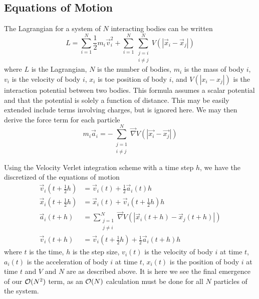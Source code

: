 %
%
\subsection{Equations of Motion}

The Lagrangian for a system of $N$ interacting bodies can be written
\begin{equation}
    L =
        \sum_{i=1}^N \frac{1}{2} m_i \vec{v}_i^2
        + \sum_{i=1}^N \sum_{\substack{j=i\\ i\ne{} j}}^N V(|\vec{x}_i - \vec{x}_j|)
\end  {equation}
where $L$ is the Lagrangian,
$N$ is the number of bodies,
$m_i$ is the mass of body $i$,
$v_i$ is the velocity of body $i$,
$x_i$ is toe position of body $i$,
and $V(|x_i - x_j|)$ is the interaction potential between two bodies.
%
This formula assumes a scalar potential and that the potential is
solely a function of distance.
%
This may be easily extended include terms involving charges, but is
ignored here.
%
We may then derive the force term for each particle
\begin{equation}
    m_i\vec{a}_i =
        - \sum_{\substack{j=1 \\ i\ne{}j}}^N
            \vec{\nabla{}}{V(|\vec{x_i} - \vec{x_j}|)}
\end  {equation}

Using the Velocity Verlet integration scheme with a time step $h$,
we have the discretized of the equations of motion
\begin{align}
    \vec{v}_i(t + \tfrac{1}{2}h) &=
        \vec{v}_i(t) + \tfrac{1}{2} \vec{a}_i(t)h
    \\
    \vec{x}_i(t + \tfrac{1}{2}h) &=
        \vec{x}_i(t) + \vec{v}_i(t + \tfrac{1}{2}h)h
    \\
    \vec{a}_i(t + h) &=
        \sum_{\substack{j=1 \\ j\ne{}i}}^N
            \vec{\nabla{}} V(|\vec{x}_i(t + h) - \vec{x}_j(t + h)|)
    \\
    \vec{v}_i(t + h) &=
        \vec{v}_i(t + \tfrac{1}{2}h) + \tfrac{1}{2}\vec{a}_i(t + h)h
\end  {align}
where $t$ is the time,
$h$ is the step size,
$v_i(t)$ is the velocity of body $i$ at time $t$,
$a_i(t)$ is the acceleration of body $i$ at time $t$,
$x_i(t)$ is the position of body $i$ at time $t$ and
$V$ and $N$ are as described above.
It is here we see the final emergence of our $\mathcal{O}{(N^2)}$ term,
as an $\mathcal{O}{(N)}$ calculation must be done for all $N$ particles of the system.

